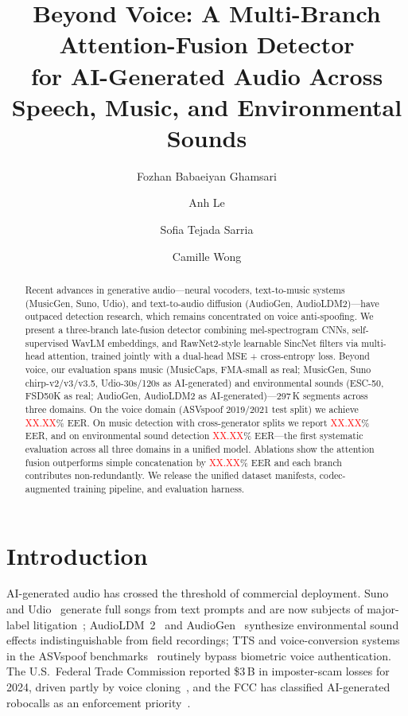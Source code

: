 \documentclass[10pt,twocolumn,a4paper]{article}
\title{\textbf{Beyond Voice: A Multi-Branch Attention-Fusion Detector\\
for AI-Generated Audio Across Speech, Music, and Environmental Sounds}}
\author[1]{Fozhan Babaeiyan Ghamsari}
\author[1]{Anh Le}
\author[1]{Sofia Tejada Sarria}
\author[1]{Camille Wong}
\affil[1]{California State University, Long Beach --- CECS~458}
\date{}
\newcommand{\NUM}{\textcolor{red}{XX.XX}}
\begin{document}
\maketitle

\begin{abstract}
Recent advances in generative audio---neural vocoders, text-to-music systems (MusicGen, Suno, Udio), and text-to-audio diffusion (AudioGen, AudioLDM2)---have outpaced detection research, which remains concentrated on voice anti-spoofing. We present a three-branch late-fusion detector combining mel-spectrogram CNNs, self-supervised WavLM embeddings, and RawNet2-style learnable SincNet filters via multi-head attention, trained jointly with a dual-head MSE + cross-entropy loss. Beyond voice, our evaluation spans music (MusicCaps, FMA-small as real; MusicGen, Suno chirp-v2/v3/v3.5, Udio-30s/120s as AI-generated) and environmental sounds (ESC-50, FSD50K as real; AudioGen, AudioLDM2 as AI-generated)---297\,K segments across three domains. On the voice domain (ASVspoof 2019/2021 test split) we achieve \NUM\% EER. On music detection with cross-generator splits we report \NUM\% EER, and on environmental sound detection \NUM\% EER---the first systematic evaluation across all three domains in a unified model. Ablations show the attention fusion outperforms simple concatenation by \NUM\% EER and each branch contributes non-redundantly. We release the unified dataset manifests, codec-augmented training pipeline, and evaluation harness.
\end{abstract}

\section{Introduction}
\label{sec:intro}

AI-generated audio has crossed the threshold of commercial deployment. Suno and Udio~\cite{suno_platform,udio_platform} generate full songs from text prompts and are now subjects of major-label litigation~\cite{billboard2025ai}; AudioLDM~2~\cite{audioldm2_2024} and AudioGen~\cite{audiogen_2023} synthesize environmental sound effects indistinguishable from field recordings; TTS and voice-conversion systems in the ASVspoof benchmarks~\cite{asvspoof2019,asvspoof2021,asvspoof5} routinely bypass biometric voice authentication. The U.S.\ Federal Trade Commission reported \$3\,B in imposter-scam losses for 2024, driven partly by voice cloning~\cite{ftc2025fraud}, and the FCC has classified AI-generated robocalls as an enforcement priority~\cite{fcc2024robocalls}.
\end{document}
